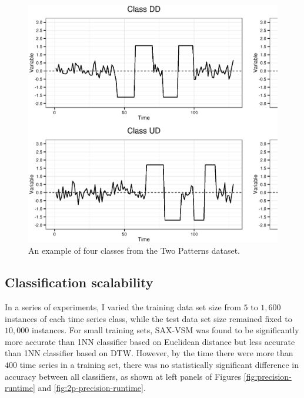 \begin{figure}[t]
   \centering
   \includegraphics[width=140mm]{figures/2patterns.ps}
   \caption{An example of four classes from the Two Patterns dataset.}
   \label{fig:2patterns}
\end{figure}

\subsection{Classification scalability}
In a series of experiments, I varied the training data set size from $5$ to $1,600$ instances of each time series class, 
while the test data set size remained fixed to $10,000$ instances. 
For small training sets, SAX-VSM was found to be significantly more accurate than 1NN classifier based on Euclidean 
distance but less accurate than 1NN classifier based on DTW. 
However, by the time there were more than $400$ time series in a training set, there was no statistically 
significant difference in accuracy between all classifiers, 
as shown at left panels of Figures \ref{fig:precision-runtime} and \ref{fig:2p-precision-runtime}. 

